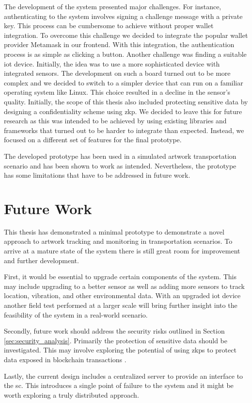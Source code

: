The development of the system presented major challenges. For instance, authenticating to the system involves signing a challenge message with a private key. This process can be cumbersome to achieve without proper wallet integration. To overcome this challenge we decided to integrate the popular wallet provider Metamask in our frontend. With this integration, the authentication process is as simple as clicking a button. Another challenge was finding a suitable \gls{iot} device. Initially, the idea was to use a more sophisticated device with integrated sensors. The development on such a board turned out to be more complex and we decided to switch to a simpler device that can run on a familiar operating system like Linux. This choice resulted in a decline in the sensor's quality. Initially, the scope of this thesis also included protecting sensitive data by designing a confidentiality scheme using \gls{zkp}. We decided to leave this for future research as this was intended to be achieved by using existing libraries and frameworks that turned out to be harder to integrate than expected. Instead, we focused on a different set of features for the final prototype.

The developed prototype has been used in a simulated artwork transportation scenario and has been shown to work as intended. Nevertheless, the prototype has some limitations that have to be addressed in future work.

\section{Future Work}
This thesis has demonstrated a minimal prototype to demonstrate a novel approach to artwork tracking and monitoring in transportation scenarios. To arrive at a mature state of the system there is still great room for improvement and further development.

First, it would be essential to upgrade certain components of the system. This may include upgrading to a better sensor as well as adding more sensors to track location, vibration, and other environmental data. With an upgraded \gls{iot} device another field test performed at a larger scale will bring further insight into the feasibility of the system in a real-world scenario.

Secondly, future work should address the security risks outlined in Section \ref{sec:security_analysis}. Primarily the protection of sensitive data should be investigated. This may involve exploring the potential of using \glspl{zkp} to protect data exposed in blockchain transactions \cite{zkdet}.

Lastly, the current design includes a centralized server to provide an interface to the \gls{sc}. This introduces a single point of failure to the system and it might be worth exploring a truly distributed approach. 